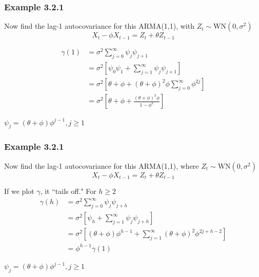 \documentclass{beamer}
\begin{document}

\begin{frame}
\frametitle{Example 3.2.1}

Now find the lag-1 autocovariance for this ARMA(1,1), with $Z_t \sim \text{WN}(0,\sigma^2)$
\[
X_t - \phi X_{t-1} = Z_t + \theta Z_{t-1}
\]

\begin{align*}
\gamma(1) &= \sigma^2\sum_{j=0}^{\infty} \psi_j\psi_{j+1} \\
&= \sigma^2 \left[\psi_0 \psi_1 + \sum_{j=1}^{\infty}\psi_j\psi_{j+1}\right] \\
&= \sigma^2\left[\theta + \phi + (\theta + \phi)^2\phi \sum_{j=0}^{\infty}\phi^{2j} \right]  \\
&= \sigma^2\left[ \theta + \phi + \frac{(\theta+\phi)^2\phi }{1 - \phi^2 } \right]
\end{align*}

$\psi_j = (\theta+\phi)\phi^{j-1}, j \ge 1$

\end{frame}


\begin{frame}
\frametitle{Example 3.2.1}

Now find the lag-1 autocovariance for this ARMA(1,1), where $Z_t \sim \text{WN}(0,\sigma^2)$
\[
X_t - \phi X_{t-1} = Z_t + \theta Z_{t-1}
\]

If we plot $\gamma$, it ``tails off." For $h \ge 2$
\begin{align*}
\gamma(h) &= \sigma^2\sum_{j=0}^{\infty} \psi_j\psi_{j+h} \\
&= \sigma^2 \left[ \psi_{h} + \sum_{j=1}^{\infty}\psi_j\psi_{j+h}\right] \\
&= \sigma^2 \left[(\theta+\phi)\phi^{h-1} + \sum_{j=1}^{\infty}(\theta+\phi)^2\phi^{2j+h-2} \right] \\
&= \phi^{h-1}\gamma(1)
\end{align*}

$\psi_j = (\theta+\phi)\phi^{j-1}, j \ge 1$


\end{frame}

\end{document}
